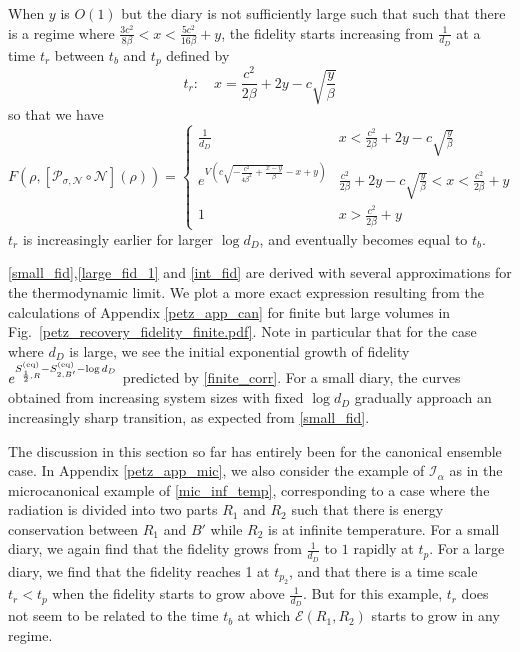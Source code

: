 \documentclass[a4paper,11pt]{article}
\newcommand\half{{\ensuremath{\frac{1}{2}}}}
\newcommand{\be}{\begin{equation}}
\newcommand{\ee}{\end{equation}}
\newcommand\al{{\alpha}}
\newcommand\ha{{\half}}
\newcommand\sE{{\ensuremath{{\mathcal E}}}}
\newcommand\sI{{\ensuremath{{\mathcal I}}}}
\begin{document}
\begin{enumerate}
When $y$ is $O(1)$ but the diary is not sufficiently large such that such that 
there is a regime where $\frac{3c^2}{8\beta} < x < \frac{5c^2}{16\beta} +y$, the fidelity starts increasing from $\frac{1}{d_D}$ at a time $t_r$ between $t_b$ and $t_p$ defined by 
\be 
t_r : \quad x = \frac{c^2}{2\beta} + 2y - c \sqrt{\frac{y}{\beta}}
\ee
so that we have 
\be 
F(\rho , [\mathcal{P}_{\sigma,\mathcal{N}}\circ \mathcal{N}](\rho))
= \begin{cases} 
\frac{1}{d_D} & x< \frac{c^2}{2\beta} + 2y - c \sqrt{\frac{y}{\beta}} \\
 e^{V (c \sqrt{-\frac{c^2}{4\beta^2} + \frac{x-y}{\beta}} -x+y )} & \frac{c^2}{2\beta} + 2y - c \sqrt{\frac{y}{\beta}} < x < \frac{c^2}{2\beta} +y\\
 1 & x> \frac{c^2}{2\beta} +y
\end{cases} 
\label{int_fid}
\ee
$t_r$ is increasingly earlier for larger $\log d_D$, and eventually becomes equal to $t_b$. 

 \eqref{small_fid},\eqref{large_fid_1} and \eqref{int_fid} are derived with several approximations for the thermodynamic limit. We plot a more exact expression resulting from the calculations of Appendix \ref{petz_app_can} for finite but large volumes in Fig.~\ref{petz_recovery_fidelity_finite.pdf}. Note in particular that for the case where $d_D$ is large, we see the initial exponential growth of fidelity $e^{S^{\rm (eq)}_{\ha, R} - S^{\rm (eq)}_{2, B'} - \log d_D}$ predicted by \eqref{finite_corr}. For a small diary, the curves obtained from increasing system sizes with fixed $\log d_D$ gradually approach an increasingly sharp transition, as expected from \eqref{small_fid}.

The discussion in this section so far has entirely been for the canonical ensemble case. In Appendix \ref{petz_app_mic}, we also consider the example of $\sI_{\al}$ as in the microcanonical example of \eqref{mic_inf_temp}, corresponding to a case where the radiation is divided into two parts $R_1$ and $R_2$ such that there is energy conservation between $R_1$ and $B'$ while $R_2$ is at infinite temperature. For a small diary, we again find that the fidelity grows from $\frac{1}{d_D}$ to $1$ rapidly at $t_p$. For a large diary, we find that the fidelity reaches 1 at $t_{p_2}$, and that there is a time scale $t_r< t_p$ when the fidelity starts to grow above $\frac{1}{d_D}$. But for this example, $t_r$ does not seem to be related to the time $t_b$ at which $\sE(R_1, R_2)$ starts to grow in any regime. 


\end{enumerate}
\end{document}
